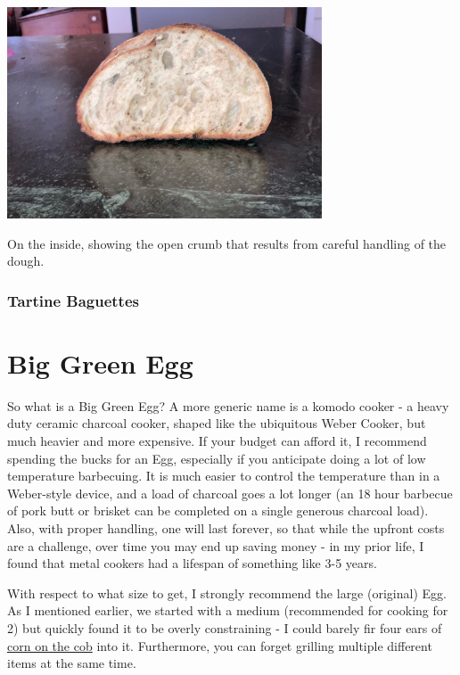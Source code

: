 \documentclass[
]{book}
\begin{document}
\includegraphics[width=0.7\textwidth,height=\textheight]{images/Tartine2.jpeg}

On the inside, showing the open crumb that results from careful handling of the dough.

\hypertarget{baguettes}{%
\subsection{Tartine Baguettes}\label{baguettes}}

\hypertarget{bge}{%
\chapter{Big Green Egg}\label{bge}}

So what is a Big Green Egg? A more generic name is a komodo cooker - a heavy duty ceramic charcoal cooker, shaped like the ubiquitous Weber Cooker, but much heavier and more expensive. If your budget can afford it, I recommend spending the bucks for an Egg, especially if you anticipate doing a lot of low temperature barbecuing. It is much easier to control the temperature than in a Weber-style device, and a load of charcoal goes a lot longer (an 18 hour barbecue of pork butt or brisket can be completed on a single generous charcoal load). Also, with proper handling, one will last forever, so that while the upfront costs are a challenge, over time you may end up saving money - in my prior life, I found that metal cookers had a lifespan of something like 3-5 years.

With respect to what size to get, I strongly recommend the large (original) Egg. As I mentioned earlier, we started with a medium (recommended for cooking for 2) but quickly found it to be overly constraining - I could barely fir four ears of \protect\hyperlink{corn}{corn on the cob} into it. Furthermore, you can forget grilling multiple different items at the same time.
\end{document}

